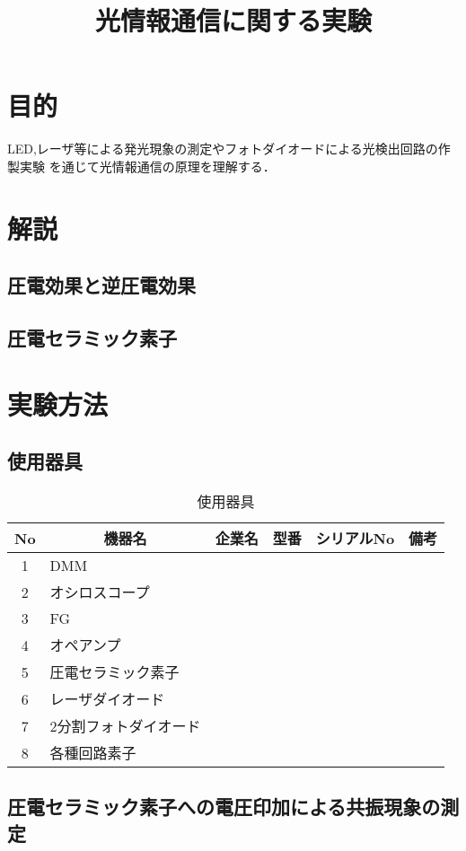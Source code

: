 \documentclass{ltjsarticle}
\title{光情報通信に関する実験}
\begin{document}
\maketitle

\section{目的}
	LED,レーザ等による発光現象の測定やフォトダイオードによる光検出回路の作製実験
	を通じて光情報通信の原理を理解する．

\section{解説}
	\subsection{圧電効果と逆圧電効果}
	\subsection{圧電セラミック素子}
\section{実験方法}
	\subsection{使用器具}
		\begin{table}[H]
		\begin{center}
		\caption{使用器具}
		\begin{tabular}{clllll} \toprule
		No&\multicolumn{1}{c}{機器名}&\multicolumn{1}{c}{企業名}&\multicolumn{1}{c}{型番}&\multicolumn{1}{c}{シリアルNo}&\multicolumn{1}{c}{備考}\\
		\hline
		1&DMM&&&\\
		2&オシロスコープ&&&\\
		3&FG&&&\\
		4&オペアンプ&&&\\
		5&圧電セラミック素子&&&\\
		6&レーザダイオード&&&\\
		7&2分割フォトダイオード&&&\\
		8&各種回路素子&&&\\
		\bottomrule
		\end{tabular}
		\end{center}
		\end{table}

	\subsection{圧電セラミック素子への電圧印加による共振現象の測定}
\end{document}
